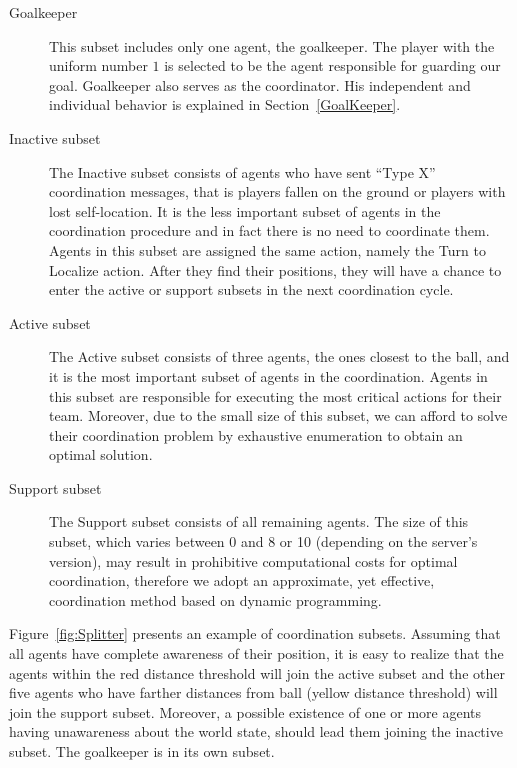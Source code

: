 \begin{description}
\item[Goalkeeper] This subset includes only one agent, the goalkeeper. The player with the uniform number $1$ is selected to be the agent responsible for guarding our goal. Goalkeeper also serves as the coordinator. His independent and individual behavior is explained in Section~\ref{GoalKeeper}.

\item[Inactive subset] The Inactive subset consists of agents who have sent ``Type X'' coordination messages, that is players fallen on the ground or players with lost self-location. It is the less important subset of agents in the coordination procedure and in fact there is no need to coordinate them. Agents in this subset are assigned the same action, namely the Turn to Localize action. After they find their positions, they will have a chance to enter the active or support subsets in the next coordination cycle.

\item[Active subset] The Active subset consists of three agents, the ones closest to the ball, and it is the most important subset of agents in the coordination. Agents in this subset are responsible for executing the most critical actions for their team. Moreover, due to the small size of this subset, we can afford to solve their coordination problem by exhaustive enumeration to obtain an optimal solution. 

\item[Support subset] The Support subset consists of all remaining agents. The size of this subset, which varies between 0 and 8 or 10 (depending on the server's version), may result in prohibitive computational costs for optimal coordination, therefore we adopt an approximate, yet effective, coordination method based on dynamic programming.
\end{description}
Figure~\ref{fig:Splitter} presents an example of coordination subsets. Assuming that all agents have complete awareness of their position, it is easy to realize that the agents within the red distance threshold will join the active subset and the other five agents who have farther distances from ball (yellow distance threshold) will join the support subset. Moreover, a possible existence of one or more agents having unawareness about the world state, should lead them joining the inactive subset. The goalkeeper is in its own subset. 

